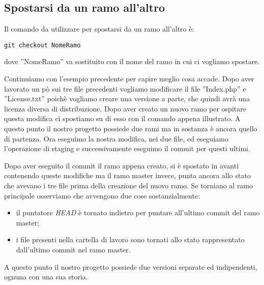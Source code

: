 \subsection{Spostarsi da un ramo all'altro}
Il comando da utilizzare per spostarsi da un ramo all'altro è:

\begin{center}
\texttt{git checkout NomeRamo}
\end{center}

dove ''NomeRamo'' va sostituito con il nome del ramo in cui ci vogliamo spostare.

Continuiamo con l'esempio precedente per capire meglio cosa accade. Dopo aver lavorato un pò sui tre file precedenti vogliamo modificare il file ''Index.php'' e ''License.txt'' poichè vogliamo creare una versione a parte, che quindi avrà una licenza diversa di distribuzione. Dopo aver creato un nuovo ramo per ospitare questa modifica ci spostiamo su di esso con il comando appena illustrato. A questo punto il nostro progetto possiede due rami ma in sostanza è ancora quello di partenza. Ora eseguimo la nostra modifica, nei due file, ed eseguiamo l'operazione di staging e successivamente eseguimo il commit per questi ultimi.

Dopo aver eseguito il commit il ramo appena creato, si è spostato in avanti contenendo queste modifiche ma il ramo master invece, punta ancora allo stato che avevano i tre file prima della creazione del nuovo ramo. Se torniano al ramo principale osserviamo che avvengono due cose sostanzialmente:

\begin{itemize}
\item il puntatore \textit{HEAD} è tornato indietro per puntare all'ultimo commit del ramo master;
\item i file presenti nella cartella di lavoro sono tornati allo stato rappresentato dall'ultimo commit nel ramo master.
\end {itemize}

A questo punto il nostro progetto possiede due versioni separate ed indipendenti, ognuna con una sua storia.
